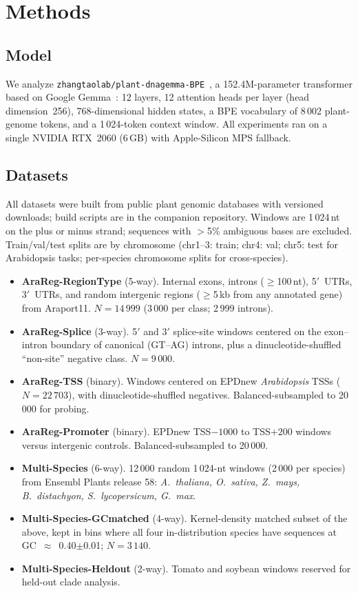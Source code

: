 \documentclass[11pt, a4paper]{article}
\begin{document}
\section*{Methods}
\label{sec:methods}

\subsection*{Model}
We analyze \texttt{zhangtaolab/plant-dnagemma-BPE}~\citep{zhang2024plantdnagemma},
a 152.4M-parameter transformer based on Google Gemma~\citep{team2024gemma}:
12 layers, 12 attention heads per layer (head dimension~256), 768-dimensional
hidden states, a BPE vocabulary of 8\,002 plant-genome tokens, and a
1\,024-token context window. All experiments ran on a single NVIDIA RTX~2060
(6\,GB) with Apple-Silicon MPS fallback.

\subsection*{Datasets}
\label{sec:data}
All datasets were built from public plant genomic databases with versioned
downloads; build scripts are in the companion repository. Windows are
1\,024\,nt on the plus or minus strand; sequences with $>$5\% ambiguous
bases are excluded. Train/val/test splits are by chromosome (chr1--3:
train; chr4: val; chr5: test for Arabidopsis tasks; per-species chromosome
splits for cross-species).
\begin{itemize}[leftmargin=1.4em,topsep=0.2em,itemsep=0.15em]
    \item \textbf{AraReg-RegionType} (5-way). Internal exons, introns
    ($\geq$100\,nt), 5$'$~UTRs, 3$'$~UTRs, and random intergenic regions
    ($\geq$5\,kb from any annotated gene) from Araport11. $N{=}14\,999$
    (3\,000 per class; 2\,999 introns).
    \item \textbf{AraReg-Splice} (3-way). 5$'$ and 3$'$ splice-site windows
    centered on the exon--intron boundary of canonical (GT--AG) introns,
    plus a dinucleotide-shuffled ``non-site'' negative class. $N{=}9\,000$.
    \item \textbf{AraReg-TSS} (binary). Windows centered on EPDnew
    \textit{Arabidopsis} TSSs ($N{=}22\,703$), with dinucleotide-shuffled
    negatives. Balanced-subsampled to 20\,000 for probing.
    \item \textbf{AraReg-Promoter} (binary). EPDnew TSS$-1000$ to TSS$+200$
    windows versus intergenic controls. Balanced-subsampled to 20\,000.
    \item \textbf{Multi-Species} (6-way). 12\,000 random 1\,024-nt windows
    (2\,000 per species) from Ensembl Plants release 58:
    \textit{A.~thaliana, O.~sativa, Z.~mays, B.~distachyon, S.~lycopersicum,
    G.~max}.
    \item \textbf{Multi-Species-GCmatched} (4-way). Kernel-density matched
    subset of the above, kept in bins where all four in-distribution
    species have sequences at GC~$\approx$~0.40$\pm$0.01; $N{=}3\,140$.
    \item \textbf{Multi-Species-Heldout} (2-way). Tomato and soybean
    windows reserved for held-out clade analysis.
\end{itemize}
\end{document}
